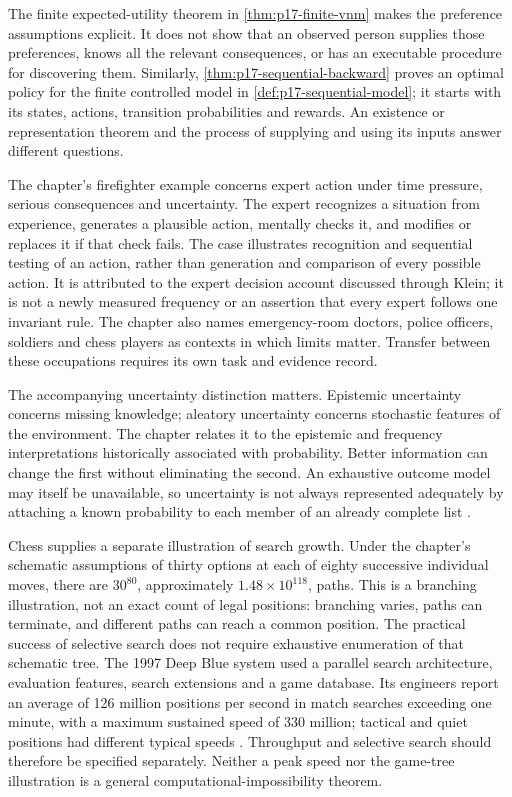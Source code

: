 The finite expected-utility theorem in \cref{thm:p17-finite-vnm} makes
the preference assumptions explicit. It does not show that an observed
person supplies those preferences, knows all the relevant consequences,
or has an executable procedure for discovering them. Similarly,
\cref{thm:p17-sequential-backward} proves an optimal policy for the
finite controlled model in \cref{def:p17-sequential-model}; it starts
with its states, actions, transition probabilities and rewards. An
existence or representation theorem and the process of supplying and
using its inputs answer different questions.

The chapter's firefighter example concerns expert action under time
pressure, serious consequences and uncertainty. The expert recognizes a
situation from experience, generates a plausible action, mentally checks
it, and modifies or replaces it if that check fails. The case illustrates
recognition and sequential testing of an action, rather than generation
and comparison of every possible action. It is attributed to the expert
decision account discussed through Klein; it is not a newly measured
frequency or an assertion that every expert follows one invariant rule.
The chapter also names emergency-room doctors, police officers, soldiers
and chess players as contexts in which limits matter. Transfer between
these occupations requires its own task and evidence record.

The accompanying uncertainty distinction matters. Epistemic uncertainty
concerns missing knowledge; aleatory uncertainty concerns stochastic
features of the environment. The chapter relates it to the epistemic
and frequency interpretations historically associated with probability.
Better information can change the first without eliminating the second.
An exhaustive outcome model may itself be unavailable, so uncertainty
is not always represented adequately by attaching a known probability
to each member of an already complete list
\cite[pp.~506--507 and note~3]{HertwigKozyreva2021Bounded}.

Chess supplies a separate illustration of search growth. Under the
chapter's schematic assumptions of thirty options at each of eighty
successive individual moves, there are \(30^{80}\), approximately
\(1.48\times10^{118}\), paths. This is a branching illustration,
not an exact count of legal positions: branching varies, paths can
terminate, and different paths can reach a common position. The practical
success of selective search does not require exhaustive enumeration of
that schematic tree. The 1997 Deep Blue system used a parallel search
architecture, evaluation features, search extensions and a game database.
Its engineers report an average of 126 million positions per second in
match searches exceeding one minute, with a maximum sustained speed of
330 million; tactical and quiet positions had different typical speeds
\cite[pp.~57--60]{CampbellHoaneHsu2002DeepBlue}.
Throughput and selective search should therefore be specified separately.
Neither a peak speed nor the game-tree illustration is a general
computational-impossibility theorem.

